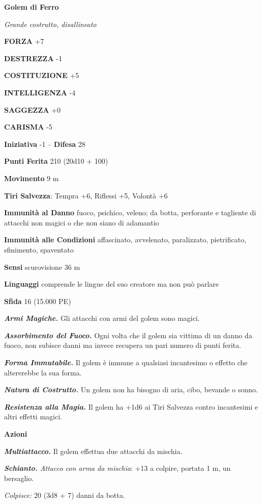 \begin{multicols}{2}
\medskip{}\textbf{Golem di Ferro}

\emph{Grande costrutto, disallineato}

\textbf{FORZA} +7

\textbf{DESTREZZA} -1

\textbf{COSTITUZIONE} +5

\textbf{INTELLIGENZA} -4

\textbf{SAGGEZZA} +0

\textbf{CARISMA} -5

\textbf{Iniziativa} -1 -- \textbf{Difesa} 28

\textbf{Punti Ferita} 210 (20d10 + 100)

\textbf{Movimento} 9 m

\textbf{Tiri Salvezza}: Tempra +6, Riflessi +5, Volontà +6

\textbf{Immunità al Danno} fuoco, psichico, veleno; da botta, perforante e tagliente di attacchi non magici o che non siano di adamantio

\textbf{Immunità alle Condizioni} affascinato, avvelenato, paralizzato, pietrificato, sfinimento, spaventato

\textbf{Sensi} scurovisione 36 m

\textbf{Linguaggi} comprende le lingue del suo creatore ma non può parlare

\textbf{Sfida} 16 (15.000 PE)

\emph{\textbf{Armi Magiche.}} Gli attacchi con armi del golem sono magici.

\emph{\textbf{Assorbimento del Fuoco.}} Ogni volta che il golem sia vittima di un danno da fuoco, non subisce danni ma invece recupera un pari numero di punti ferita.

\emph{\textbf{Forma Immutabile.}} Il golem è immune a qualsiasi incantesimo o effetto che altererebbe la sua forma.

\emph{\textbf{Natura di Costrutto.}} Un golem non ha bisogno di aria, cibo, bevande o sonno.

\emph{\textbf{Resistenza alla Magia.}} Il golem ha +1d6 ai Tiri Salvezza contro incantesimi e altri effetti magici.

\textbf{Azioni}

\emph{\textbf{Multiattacco.}} Il golem effettua due attacchi da mischia.

\emph{\textbf{Schianto.} Attacco con arma da mischia}: +13 a colpire, portata 1 m, un bersaglio.

\emph{Colpisce:} 20 (3d8 + 7) danni da botta.


\end{multicols}
